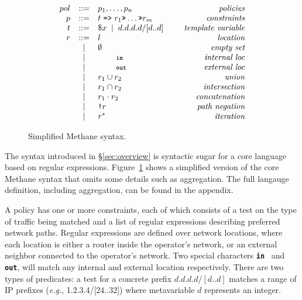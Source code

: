 \documentclass[numbers, 10pt, preprint]{sigplanconf}
\newcommand{\EG}{\emph{e.g.}}
\newcommand{\sysname}{{\small \sf Methane}\xspace}
\newcommand{\KW}[1]{\texttt{\small\bfseries{#1}}}
\newcommand{\Prefer}{\texttt{>>}}
\newcommand{\Path}{\texttt{=>}}
\newcommand{\In}{\KW{in}}
\newcommand{\Out}{\KW{out}}
\newcommand{\NOT}{\texttt{!}}
\newcommand{\BNFALT}{\;\;|\;\;}
\begin{document}
\begin{figure}[t]\small
  \begin{minipage}[t]{\linewidth}
  \vspace*{-1\baselineskip}
  \[ \begin{array}{rclr}
     pol     &::=& p_1, \dots, p_n & \textit{policies} \\
     p       &::=& t \hspace{.3em} \Path \hspace{.3em} r_1 \Prefer \dots \Prefer r_m & \textit{constraints} \\
     t       &::=& \$x \BNFALT d.d.d.d/[d..d] \hspace{1.5em} & \textit{template variable} \\
     r       &::=& l & \textit{location} \\
         &\BNFALT& \emptyset & \textit{empty set} \\
         &\BNFALT& \In & \textit{internal loc} \\
         &\BNFALT& \Out & \textit{external loc} \\
         &\BNFALT& r_1 \cup r_2 & \textit{union} \\
         &\BNFALT& r_1 \cap r_2 & \textit{intersection} \\
         &\BNFALT& r_1 \cdot r_2 & \textit{concatenation} \\
         &\BNFALT& \NOT r & \textit{path negation} \\
         &\BNFALT& r^* & \textit{iteration} \\
  \end{array} \]%

  \end{minipage}
  \vspace{1em}
  \caption{Simplified \sysname syntax.}
  \label{fig:syntax}
\end{figure}%

The syntax introduced in \S\ref{sec:overview} is syntactic sugar for a core language based on regular expressions. Figure~\ref{fig:syntax} shows a simplified version of the core \sysname syntax that omits some details such as aggregation. The full langauge definition, including aggregation, can be found in the appendix.

A policy has one or more constraints, each of which consists of a test on the type of traffic being matched and a list of regular expressions describing preferred network paths. Regular expressions are defined over network locations, where each location is either a router inside the operator's network, or an external neighbor connected to the operator's network. Two special characters \In~ and \Out, will match any internal and external location respectively. There are two types of predicates: a test for a concrete prefix $d.d.d.d/[d..d]$ matches a range of IP prefixes (\EG, 1.2.3.4/[24..32]) where metavariable $d$ represents an integer.
\end{document}
